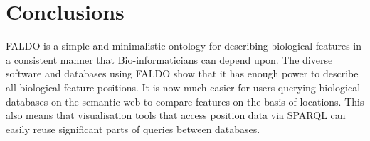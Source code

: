 \section*{Conclusions}
FALDO is a simple and minimalistic ontology for describing biological features in a consistent manner that Bio-informaticians can depend upon.
The diverse software and databases using FALDO show that it has enough power to describe all biological feature positions.
It is now much easier for users querying biological databases on the semantic web to compare features on the basis of locations.
This also means that visualisation tools that access position data via SPARQL can easily reuse significant parts of queries between databases.